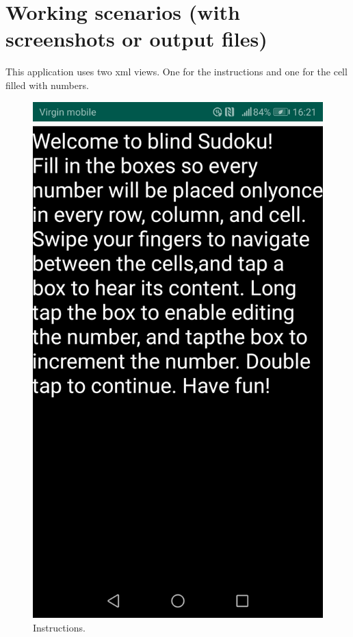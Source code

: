 \documentclass[a4paper,twoside,12pt]{book}
\begin{document}

\section {Working scenarios (with screenshots or output files)}

\par This application uses two xml views. One for the instructions and one for the cell filled with numbers.

\begin{figure}
\centering
  \includegraphics[width=\linewidth/2]{instructions.jpg}
  \caption{Instructions.}
  \label{fig:Game instructions}
\end{figure}
\end{document}

